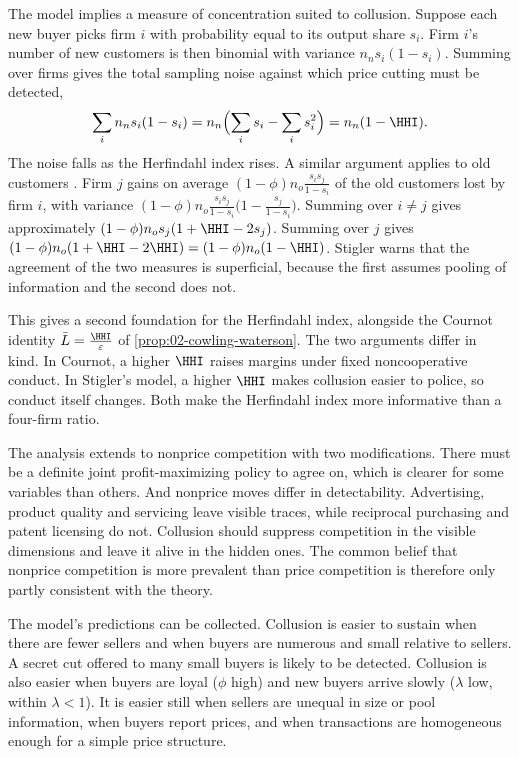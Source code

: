 The model implies a measure of concentration suited to collusion. Suppose each new buyer picks firm $i$ with
probability equal to its output share $s_i$. Firm $i$'s number of new customers is then binomial with variance
$n_ns_i(1 - s_i)$. Summing over firms gives the total sampling noise against which price cutting must be detected,
\begin{equation}\label{eq:02-stigler-hhi}
\sum_{i} n_n s_i(1 - s_i) = n_n\Bigl(\sum_i s_i - \sum_i s_i^2\Bigr) = n_n(1 - \HHI) .
\end{equation}
The noise falls as the Herfindahl index rises. A similar argument applies to old customers
\citep[footnote 12]{Stigler1964}. Firm $j$ gains on average $(1 - \phi)n_o\frac{s_is_j}{1 - s_i}$ of the old customers
lost by firm $i$, with variance $(1 - \phi)n_o\frac{s_is_j}{1 - s_i}\bigl(1 - \frac{s_j}{1 - s_i}\bigr)$. Summing over
$i \ne j$ gives approximately $(1 - \phi)n_os_j(1 + \HHI - 2s_j)$. Summing over $j$ gives
$(1 - \phi)n_o(1 + \HHI - 2\HHI) = (1 - \phi)n_o(1 - \HHI)$. Stigler warns that the agreement of the two measures is
superficial, because the first assumes pooling of information and the second does not.

This gives a second foundation for the Herfindahl index, alongside the Cournot identity
$\bar L = \frac{\HHI}{\varepsilon}$ of \cref{prop:02-cowling-waterson}. The two arguments differ in kind. In Cournot,
a higher $\HHI$ raises margins under fixed noncooperative conduct. In Stigler's model, a higher $\HHI$ makes
collusion easier to police, so conduct itself changes. Both make the Herfindahl index more informative than a
four-firm ratio.

The analysis extends to nonprice competition with two modifications. There must be a definite joint
profit-maximizing policy to agree on, which is clearer for some variables than others. And nonprice moves differ in
detectability. Advertising, product quality and servicing leave visible traces, while reciprocal purchasing and
patent licensing do not. Collusion should suppress competition in the visible dimensions and leave it alive in the
hidden ones. The common belief that nonprice competition is more prevalent than price competition is therefore only
partly consistent with the theory.

The model's predictions can be collected. Collusion is easier to sustain when there are fewer sellers and when
buyers are numerous and small relative to sellers. A secret cut offered to many small buyers is likely to be
detected. Collusion is also easier when buyers are loyal ($\phi$ high) and new buyers arrive slowly ($\lambda$ low,
within $\lambda < 1$). It is easier still when sellers are unequal in size or pool information, when buyers report prices,
and when transactions are homogeneous enough for a simple price structure.


